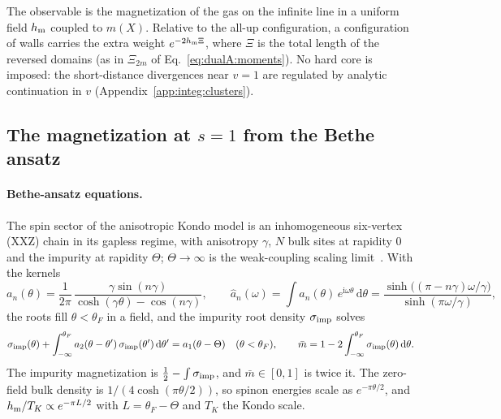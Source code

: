 \documentclass[11pt,a4paper]{article}
\numberwithin{equation}{section}
\newcommand{\dd}{\,\mathrm d}
\begin{document}
The observable is the magnetization of the gas on the infinite line in a uniform field $h_{\rm m}$ coupled to $m(X)$.
Relative to the all-up configuration, a configuration of walls carries the extra weight $e^{-2h_{\rm m}\Xi}$, where
$\Xi$ is the total length of the reversed domains (as in $\Xi_{2m}$ of Eq.~\eqref{eq:dualA:moments}). No hard core is
imposed: the short-distance divergences near $v=1$ are regulated by analytic continuation in $v$
(Appendix~\ref{app:integ:clusters}).

\subsection{The magnetization at \texorpdfstring{$s=1$}{s=1} from the Bethe ansatz}\label{app:integ:BA}
\paragraph{Bethe-ansatz equations.} The spin sector of the anisotropic Kondo model is an inhomogeneous six-vertex
(XXZ) chain in its gapless regime, with anisotropy $\gamma$, $N$ bulk sites at rapidity $0$ and the impurity at
rapidity $\Theta$; $\Theta\to\infty$ is the weak-coupling scaling limit~\cite{Andrei:1983,Tsvelick:1983}. With the
kernels
\begin{equation}
 a_n(\theta)=\frac1{2\pi}\,\frac{\gamma\sin(n\gamma)}{\cosh(\gamma\theta)-\cos(n\gamma)},\qquad
 \hat a_n(\omega)=\int a_n(\theta)\,e^{\mathrm i\omega\theta}\dd\theta
 =\frac{\sinh\bigl((\pi-n\gamma)\omega/\gamma\bigr)}{\sinh(\pi\omega/\gamma)},
\end{equation}
the roots fill $\theta<\theta_F$ in a field, and the impurity root density $\sigma_{\rm imp}$ solves
\begin{equation}
 \sigma_{\rm imp}(\theta)+\int_{-\infty}^{\theta_F}a_2(\theta-\theta')\,\sigma_{\rm imp}(\theta')\dd\theta'
 =a_1(\theta-\Theta)\quad(\theta<\theta_F),\qquad
 \bar m=1-2\int_{-\infty}^{\theta_F}\sigma_{\rm imp}(\theta)\dd\theta .
 \label{eq:integ:BAE}
\end{equation}
The impurity magnetization is $\frac12-\int\sigma_{\rm imp}$, and $\bar m\in[0,1]$ is twice it. The zero-field bulk
density is $1/(4\cosh(\pi\theta/2))$, so spinon energies scale as $e^{-\pi\theta/2}$, and $h_{\rm m}/T_K\propto
e^{-\pi L/2}$ with $L=\theta_F-\Theta$ and $T_K$ the Kondo scale.
\end{document}
